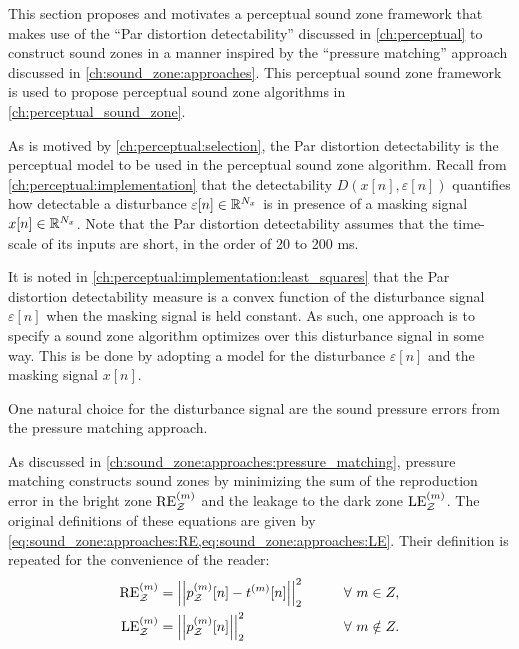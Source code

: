 This section proposes and motivates a perceptual sound zone framework that makes use of the 
``Par distortion detectability'' discussed in \autoref{ch:perceptual} to construct sound zones in a manner inspired by the ``pressure matching'' approach discussed in \autoref{ch:sound_zone:approaches}.
This perceptual sound zone framework is used to propose perceptual sound zone algorithms in 
\autoref{ch:perceptual_sound_zone}.

As is motived by \autoref{ch:perceptual:selection}, the Par distortion detectability is the 
perceptual model to be used in the perceptual sound zone algorithm.
Recall from \autoref{ch:perceptual:implementation} that the detectability 
$D(x[n],\varepsilon[n])$ quantifies how detectable a disturbance $\varepsilon[n]\in\mathbb{R}^{N_x}$ 
is in presence of a masking signal $x[n]\in\mathbb{R}^{N_x}$.
Note that the Par distortion detectability assumes that the time-scale of its inputs are short, 
in the order of 20 to 200 ms.

It is noted in \autoref{ch:perceptual:implementation:least_squares} that the Par distortion detectability measure is a convex function of the disturbance signal $\varepsilon[n]$ when the masking signal is held constant. 
As such, one approach is to specify a sound zone algorithm optimizes over this disturbance signal in some way.
This is be done by adopting a model for the disturbance $\varepsilon[n]$ and the masking signal $x[n]$.

One natural choice for the disturbance signal are the sound pressure errors from the pressure matching approach.

As discussed in \autoref{ch:sound_zone:approaches:pressure_matching}, pressure matching constructs sound zones by minimizing the sum of the reproduction error in the bright zone $\text{RE}^{(m)}_{\mathcal{Z}}$ and the leakage to the dark zone $\text{LE}^{(m)}_{\mathcal{Z}}$.
The original definitions of these equations are given by \autoref{eq:sound_zone:approaches:RE,eq:sound_zone:approaches:LE}.
Their definition is repeated for the convenience of the reader: 
\begin{alignat}{2}
    \text{RE}^{(m)}_\zz &= \norm[2][2]{p_\zz^{(m)}[n] - t^{(m)}[n]} \qquad&& \forall\,\, m\in Z, \\
    \text{LE}^{(m)}_\zz &= \norm[2][2]{p_\zz^{(m)}[n]} \qquad&& \forall\,\, m\notin Z. 
\end{alignat}

